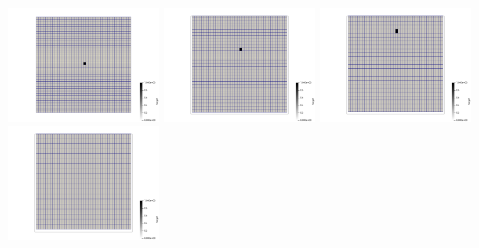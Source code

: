 \begin{center}
\includegraphics[width=4cm]{python_codes/fieldstone_89/results/vertical/target0000}
\includegraphics[width=4cm]{python_codes/fieldstone_89/results/vertical/target0005}
\includegraphics[width=4cm]{python_codes/fieldstone_89/results/vertical/target0010}
\includegraphics[width=4cm]{python_codes/fieldstone_89/results/vertical/target0015}
\end{center}


